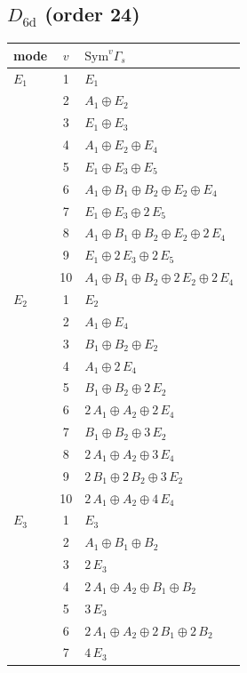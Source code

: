 \documentclass[11pt]{article}
\begin{document}
\subsection*{$D_{6\mathrm{d}}$ \quad (order 24)}
\begin{longtable}{l c p{}}
\hline mode & $v$ & $\mathrm{Sym}^v\Gamma_s$\\ \hline\endhead
$E_{1}$ & 1 & $E_{1}$\\
 & 2 & $A_{1}\oplus E_{2}$\\
 & 3 & $E_{1}\oplus E_{3}$\\
 & 4 & $A_{1}\oplus E_{2}\oplus E_{4}$\\
 & 5 & $E_{1}\oplus E_{3}\oplus E_{5}$\\
 & 6 & $A_{1}\oplus B_{1}\oplus B_{2}\oplus E_{2}\oplus E_{4}$\\
 & 7 & $E_{1}\oplus E_{3}\oplus 2\,E_{5}$\\
 & 8 & $A_{1}\oplus B_{1}\oplus B_{2}\oplus E_{2}\oplus 2\,E_{4}$\\
 & 9 & $E_{1}\oplus 2\,E_{3}\oplus 2\,E_{5}$\\
 & 10 & $A_{1}\oplus B_{1}\oplus B_{2}\oplus 2\,E_{2}\oplus 2\,E_{4}$\\
\hline
$E_{2}$ & 1 & $E_{2}$\\
 & 2 & $A_{1}\oplus E_{4}$\\
 & 3 & $B_{1}\oplus B_{2}\oplus E_{2}$\\
 & 4 & $A_{1}\oplus 2\,E_{4}$\\
 & 5 & $B_{1}\oplus B_{2}\oplus 2\,E_{2}$\\
 & 6 & $2\,A_{1}\oplus A_{2}\oplus 2\,E_{4}$\\
 & 7 & $B_{1}\oplus B_{2}\oplus 3\,E_{2}$\\
 & 8 & $2\,A_{1}\oplus A_{2}\oplus 3\,E_{4}$\\
 & 9 & $2\,B_{1}\oplus 2\,B_{2}\oplus 3\,E_{2}$\\
 & 10 & $2\,A_{1}\oplus A_{2}\oplus 4\,E_{4}$\\
\hline
$E_{3}$ & 1 & $E_{3}$\\
 & 2 & $A_{1}\oplus B_{1}\oplus B_{2}$\\
 & 3 & $2\,E_{3}$\\
 & 4 & $2\,A_{1}\oplus A_{2}\oplus B_{1}\oplus B_{2}$\\
 & 5 & $3\,E_{3}$\\
 & 6 & $2\,A_{1}\oplus A_{2}\oplus 2\,B_{1}\oplus 2\,B_{2}$\\
 & 7 & $4\,E_{3}$\\

\end{longtable}
\end{document}
